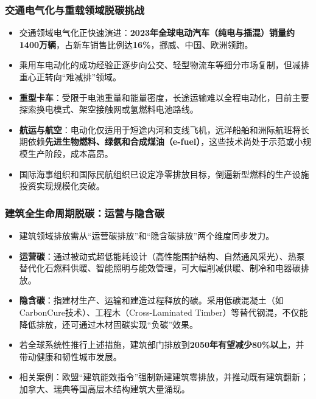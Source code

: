 \documentclass[11pt]{beamer}
\begin{document}
\begin{frame}
\frametitle{交通电气化与重载领域脱碳挑战}
\small
\begin{itemize}
  \item 交通领域电气化正快速演进：\textbf{2023年全球电动汽车（纯电与插混）销量约1400万辆}，占新车销售比例达\textbf{16\%}，挪威、中国、欧洲领跑。
  \item 乘用车电动化的成功经验正逐步向公交、轻型物流车等细分市场复制，但减排重心正转向“难减排”领域。
  \item \textbf{重型卡车}：受限于电池重量和能量密度，长途运输难以全程电动化，目前主要探索换电模式、架空接触网或氢燃料电池路线。
  \item \textbf{航运与航空}：电动化仅适用于短途内河和支线飞机，远洋船舶和洲际航班将长期依赖\textbf{先进生物燃料、绿氨和合成煤油（e-fuel）}，这些技术尚处于示范或小规模生产阶段，成本高昂。
  \item 国际海事组织和国际民航组织已设定净零排放目标，倒逼新型燃料的生产设施投资实现规模化突破。
\end{itemize}
\end{frame}

\begin{frame}
\frametitle{建筑全生命周期脱碳：运营与隐含碳}
\small
\begin{itemize}
  \item 建筑领域排放需从“运营碳排放”和“隐含碳排放”两个维度同步发力。
  \item \textbf{运营碳}：通过\alert{被动式超低能耗设计}（高性能围护结构、自然通风采光）、\alert{热泵}替代化石燃料供暖、智能照明与能效管理，可大幅削减供暖、制冷和电器碳排放。
  \item \textbf{隐含碳}：指建材生产、运输和建造过程释放的碳。采用\alert{低碳混凝土}（如CarbonCure技术）、\alert{工程木}（Cross-Laminated Timber）等替代钢混，不仅能降低排放，还可通过木材固碳实现“负碳”效果。
  \item 若全球系统性推行上述措施，建筑部门排放到\textbf{2050年有望减少80\%以上}，并带动健康和韧性城市发展。
  \item 相关案例：欧盟“建筑能效指令”强制新建建筑零排放，并推动既有建筑翻新；加拿大、瑞典等国高层木结构建筑大量涌现。
\end{itemize}
\end{frame}
\end{document}

